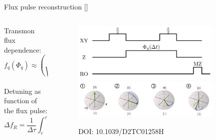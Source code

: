 \documentclass[aspectratio=169,10pt]{beamer}
\begin{document}
\begin{frame}{Flux pulse reconstruction [\cite{rol_time-domain_2020}]}
  \begin{columns}
    \begin{column}{0.5\textwidth}
      \centering
      Transmon flux dependence:
      \begin{equation*}
        f_q(\Phi_q) \approx \left( \sqrt{8E_J E_C \left| \cos\left(\pi \frac{\Phi_q}{\Phi_0}\right) \right|} \right)
      \end{equation*}\\
      \vspace{3em}
      Detuning as function of the flux pulse:
      \begin{equation*}
        \Delta f_R = \frac{1}{\Delta \tau} \int_{\tau}^{\tau + \Delta \tau} \Delta f_Q(\Phi_{Q, \tau + \Delta \tau} (t))
      \end{equation*}
    \end{column}
    \begin{column}{0.5\textwidth}
      \begin{figure}
        \centering
        \includegraphics[width=0.85\textwidth]{figures/cryoscope_pulse.png}\\
        \vspace{3em}
        \includegraphics[width=0.85\textwidth]{figures/BlochEvolution.png}
        \caption{DOI: 10.1039/D2TC01258H}
      \end{figure}
    \end{column}
  \end{columns}
\end{frame}
\end{document}
